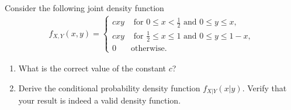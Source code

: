 \begin{exercise}
 Consider the following joint density function
\begin{align*}
    f_{X,Y}(x,y) = \left\{\begin{array}{ll}
        cxy & \text{ for } 0\leq x<\frac{1}{2} \text{ and } 0\leq y\leq x,\\
        cxy & \text{ for } \frac{1}{2}\leq x\leq 1 \text{ and } 0\leq y\leq 1-x,\\
        0 & \text{otherwise.}
    \end{array}\right.
\end{align*}
\begin{enumerate}
\item  What is the correct value of the constant $c$?
\item Derive the conditional probability density function $f_{X|Y}(x|y)$. Verify that your result is indeed a valid density function.
\end{enumerate}


\end{exercise}
